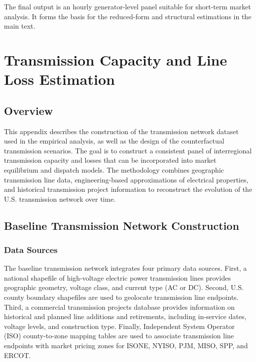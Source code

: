 \documentclass[12pt]{article}
\begin{document}
The final output is an hourly generator-level panel suitable for short-term market analysis. It forms the basis for the reduced-form and structural estimations in the main text.

\section{Transmission Capacity and Line Loss Estimation} \label{sec:appendixc}

\subsection{Overview}

This appendix describes the construction of the transmission network dataset used in the empirical analysis, as well as the design of the counterfactual transmission scenarios. The goal is to construct a consistent panel of interregional transmission capacity and losses that can be incorporated into market equilibrium and dispatch models. The methodology combines geographic transmission line data, engineering-based approximations of electrical properties, and historical transmission project information to reconstruct the evolution of the U.S. transmission network over time.

\subsection{Baseline Transmission Network Construction}

\subsubsection{Data Sources}

The baseline transmission network integrates four primary data sources. First, a national shapefile of high-voltage electric power transmission lines provides geographic geometry, voltage class, and current type (AC or DC). Second, U.S. county boundary shapefiles are used to geolocate transmission line endpoints. Third, a commercial transmission projects database provides information on historical and planned line additions and retirements, including in-service dates, voltage levels, and construction type. Finally, Independent System Operator (ISO) county-to-zone mapping tables are used to associate transmission line endpoints with market pricing zones for ISONE, NYISO, PJM, MISO, SPP, and ERCOT.
\end{document}
